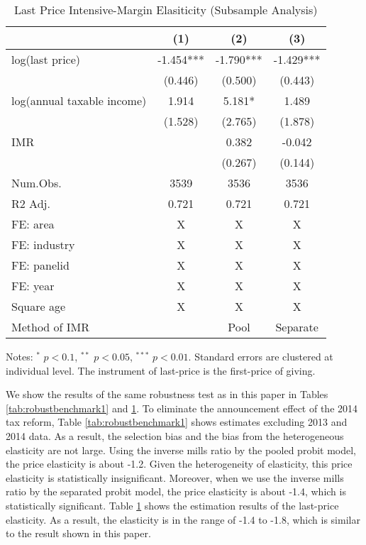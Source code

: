 \documentclass[
  11pt,
  a4paper,
]{article}
\begin{document}
\begin{table}

\caption{\label{tab:robustbenchmark2}Last Price Intensive-Margin Elasiticity (Subsample Analysis)}
\centering
\fontsize{9}{11}\selectfont
\begin{threeparttable}
\begin{tabular}[t]{lccc}
\toprule
  & (1) & (2) & (3)\\
\midrule
log(last price) & -1.454*** & -1.790*** & -1.429***\\
 & (0.446) & (0.500) & (0.443)\\
log(annual taxable income) & 1.914 & 5.181* & 1.489\\
 & (1.528) & (2.765) & (1.878)\\
IMR &  & 0.382 & -0.042\\
 &  & (0.267) & (0.144)\\
\midrule
Num.Obs. & 3539 & 3536 & 3536\\
R2 Adj. & 0.721 & 0.721 & 0.721\\
FE: area & X & X & X\\
FE: industry & X & X & X\\
FE: panelid & X & X & X\\
FE: year & X & X & X\\
Square age & X & X & X\\
Method of IMR &  & Pool & Separate\\
\bottomrule
\end{tabular}
\begin{tablenotes}
\item Notes: $^{*}$ $p < 0.1$, $^{**}$ $p < 0.05$, $^{***}$ $p < 0.01$. Standard errors are clustered at individual level. The instrument of last-price is the first-price of giving.
\end{tablenotes}
\end{threeparttable}
\end{table}

We show the results of the same robustness test as in this paper
in Tables \ref{tab:robustbenchmark1} and \ref{tab:robustbenchmark2}.
To eliminate the announcement effect of the 2014 tax reform,
Table \ref{tab:robustbenchmark1} shows
estimates excluding 2013 and 2014 data.
As a result, the selection bias and
the bias from the heterogeneous elasticity are not large.
Using the inverse mills ratio by the pooled probit model,
the price elasticity is about -1.2.
Given the heterogeneity of elasticity,
this price elasticity is statistically insignificant.
Moreover,
when we use the inverse mills ratio by the separated probit model,
the price elasticity is about -1.4, which is statistically significant.
Table \ref{tab:robustbenchmark2} shows
the estimation results of the last-price elasticity.
As a result, the elasticity is in the range of -1.4 to -1.8,
which is similar to the result shown in this paper.
\end{document}
